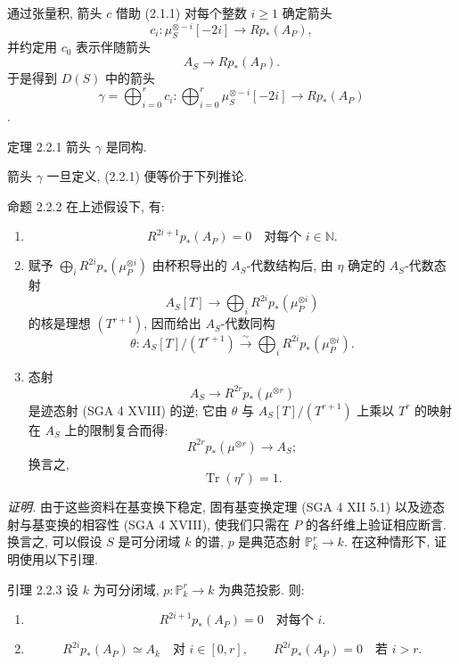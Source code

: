 通过张量积, 箭头 $c$ 借助 (2.1.1) 对每个整数 $i\ge1$ 确定箭头
\[
c_i:\mu_S^{\otimes -i}[-2i]\longrightarrow Rp_*(A_P),
\]
并约定用 $c_0$ 表示伴随箭头
\[
A_S\longrightarrow Rp_*(A_P).
\]
于是得到 $D(S)$ 中的箭头
\[
\gamma=\bigoplus_{i=0}^{r}c_i:
\bigoplus_{i=0}^{r}\mu_S^{\otimes -i}[-2i]\longrightarrow Rp_*(A_P)
\]
.

\begin{statement}{定理 2.2.1}
箭头 $\gamma$ 是同构.
\end{statement}

箭头 $\gamma$ 一旦定义, (2.2.1) 便等价于下列推论.

\begin{statement}{命题 2.2.2}
在上述假设下, 有:
\begin{enumerate}[label=\alph*)]
\item
\[
R^{2i+1}p_*(A_P)=0\quad\text{对每个 }i\in\mathbb N.
\]
\item 赋予 $\bigoplus_i R^{2i}p_*(\mu_P^{\otimes i})$ 由杯积导出的 $A_S$-代数结构后, 由 $\eta$ 确定的 $A_S$-代数态射
\[
A_S[T]\longrightarrow \bigoplus_i R^{2i}p_*(\mu_P^{\otimes i})
\]
的核是理想 $(T^{r+1})$, 因而给出 $A_S$-代数同构
\[
\theta:A_S[T]/(T^{r+1})\xrightarrow{\sim}\bigoplus_i R^{2i}p_*(\mu_P^{\otimes i}).
\]
\item 态射
\[
A_S\longrightarrow R^{2r}p_*(\mu^{\otimes r})
\]
是迹态射 (SGA 4 XVIII) 的逆; 它由 $\theta$ 与 $A_S[T]/(T^{r+1})$ 上乘以 $T^r$ 的映射在 $A_S$ 上的限制复合而得:
\[
R^{2r}p_*(\mu^{\otimes r})\longrightarrow A_S;
\]
换言之,
\[
\operatorname{Tr}(\eta^r)=1.
\]
\end{enumerate}
\end{statement}

\emph{证明.} 由于这些资料在基变换下稳定, 固有基变换定理 (SGA 4 XII 5.1) 以及迹态射与基变换的相容性 (SGA 4 XVIII), 使我们只需在 $P$ 的各纤维上验证相应断言. 换言之, 可以假设 $S$ 是可分闭域 $k$ 的谱, $p$ 是典范态射 $\mathbb P^r_k\to k$. 在这种情形下, 证明使用以下引理.

\begin{statement}{引理 2.2.3}
设 $k$ 为可分闭域, $p:\mathbb P_k^r\to k$ 为典范投影. 则:
\begin{enumerate}[label=\alph*)]
\item
\[
R^{2i+1}p_*(A_P)=0\quad\text{对每个 }i.
\]
\item
\[
R^{2i}p_*(A_P)\simeq A_k\quad\text{对 }i\in[0,r],
\qquad
R^{2i}p_*(A_P)=0\quad\text{若 }i>r.
\]
\end{enumerate}
\end{statement}

